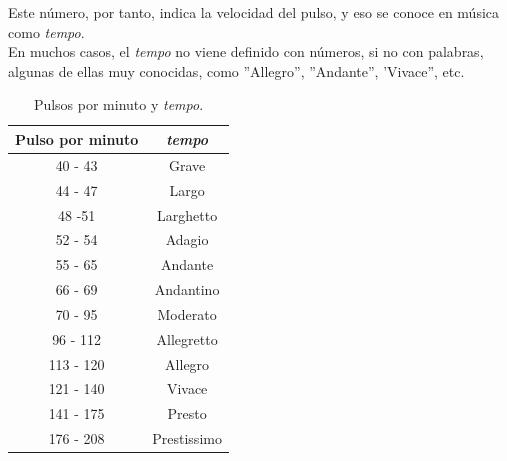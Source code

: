 \documentclass[a4paper, openright, 11pt, titlepage]{report}
\theoremstyle{definition}\newtheorem{defin}[propo]{Definition}
\theoremstyle{definition}\newtheorem{obser}[propo]{Remark}
\theoremstyle{definition}\newtheorem{ejem}[propo]{Ejemplo}
\theoremstyle{definition}\newtheorem{algoritmo}[propo]{Algoritmo}
\begin{document}
Este número, por tanto, indica la velocidad del pulso, y eso se conoce en música como \textit{tempo}.\\ En muchos casos, el \textit{tempo} no viene definido con números, si no con palabras, algunas de ellas muy conocidas, como ''Allegro'', ''Andante'', 'Vivace'', etc.
\begin{table}[H]
    \centering
    \begin{tabular}{c|c}
     Pulso por minuto & \textit{tempo} \\
    \hline \hline
     40 - 43 & Grave\\
     44 - 47 & Largo \\
     48 -51 & Larghetto \\
     52 - 54 & Adagio\\
     55 - 65 & Andante \\
     66 - 69 & Andantino \\
     70 - 95 & Moderato \\
     96 - 112 & Allegretto \\
     113 - 120 & Allegro \\
     121 - 140 & Vivace \\
     141 - 175 & Presto\\
     176 - 208 & Prestissimo\\
     \hline
    \end{tabular}
    \caption{Pulsos por minuto y \textit{tempo}.}
\end{table}
\end{document}

